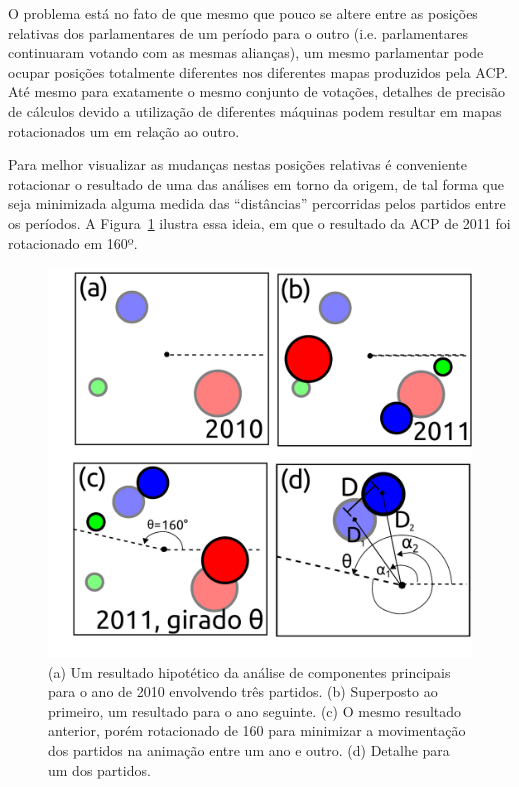 \documentclass[a4paper, 12pt]{article}
\begin{document}
O problema está no fato de que mesmo que pouco se altere entre as posições relativas dos parlamentares de um período para o outro (i.e. parlamentares continuaram votando com as mesmas alianças), um mesmo parlamentar pode ocupar posições totalmente diferentes nos diferentes mapas produzidos pela ACP. Até mesmo para exatamente o mesmo conjunto de votações, detalhes de precisão de cálculos devido a utilização de diferentes máquinas podem resultar em mapas rotacionados um em relação ao outro.

Para melhor visualizar as mudanças nestas posições relativas é conveniente rotacionar o resultado de uma das análises em torno da origem, de tal forma que seja minimizada alguma medida das ``distâncias'' percorridas pelos partidos entre os períodos. A Figura~\ref{fig:rotacoes} ilustra essa ideia, em que o resultado da
ACP de 2011 foi rotacionado em 160º. \\

\begin{figure}[h]
  \centering
  \includegraphics[scale=0.5]{figs/rotacoes.pdf}
  \caption{(a) Um resultado hipotético da análise de componentes principais para o ano de 2010 envolvendo três partidos. (b) Superposto ao primeiro, um resultado para o ano seguinte. (c) O mesmo resultado anterior, porém rotacionado de 160\textdegree{} para minimizar a movimentação dos partidos na animação entre um ano e outro. (d) Detalhe para um dos partidos.}
  \label{fig:rotacoes}
\end{figure}
\end{document}
